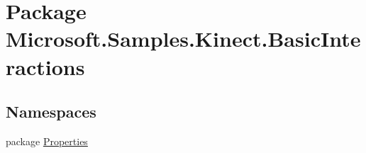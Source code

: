 \hypertarget{namespace_microsoft_1_1_samples_1_1_kinect_1_1_basic_interactions}{\section{Package Microsoft.\-Samples.\-Kinect.\-Basic\-Interactions}
\label{namespace_microsoft_1_1_samples_1_1_kinect_1_1_basic_interactions}
}
\subsection*{Namespaces}
\begin{DoxyCompactItemize}
\item 
package \hyperlink{namespace_microsoft_1_1_samples_1_1_kinect_1_1_basic_interactions_1_1_properties}{Properties}
\end{DoxyCompactItemize}
